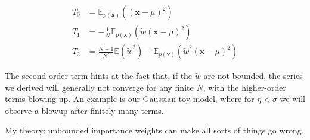\documentclass[10pt,english]{article}
\newcommand{\E}{\mathbb{E}}
\newcommand{\mathbold}[1]{\ensuremath{\boldsymbol{\mathbf{#1}}}}
\newcommand{\bx}{\mathbold{x}}
\newcommand{\px}{{p(\bx)}}
\begin{document}
\begin{align*}
T_0 &= \E_\px\left((\bx - \mu)^2 \right) \\
T_1 &= -\frac 1 N \E_\px\left(\tilde w(\bx - \mu)^2 \right) \\
T_2 &= \frac {N - 1}{N^2} \E(\tilde w^2) + \E_\px\left(\tilde w^2 (\bx - \mu)^2 \right)
\end{align*}

\noindent The second-order term hints at the fact that, if the $\tilde w$ are not bounded, the series we derived will generally not converge for any finite $N$, with the higher-order terms blowing up. An example is our Gaussian toy model, where for $\eta < \sigma$ we will observe a blowup after finitely many terms.

My theory: unbounded importance weights can make all sorts of things go wrong.
\end{document}
